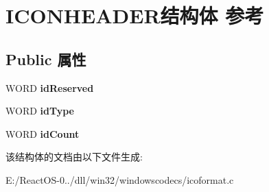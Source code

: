 \hypertarget{struct_i_c_o_n_h_e_a_d_e_r}{}\section{I\+C\+O\+N\+H\+E\+A\+D\+E\+R结构体 参考}
\label{struct_i_c_o_n_h_e_a_d_e_r}
\subsection*{Public 属性}
\begin{DoxyCompactItemize}
\item 
\mbox{\label{struct_i_c_o_n_h_e_a_d_e_r_a3c3c0880fd4a15ee4e060adab2610fee}} 
W\+O\+RD {\bfseries id\+Reserved}
\item 
\mbox{\label{struct_i_c_o_n_h_e_a_d_e_r_a62ffb9f6f6f5122517bf7ffd79318e6e}} 
W\+O\+RD {\bfseries id\+Type}
\item 
\mbox{\label{struct_i_c_o_n_h_e_a_d_e_r_adda212519cf6bd6a83a7f2d43ba0da33}} 
W\+O\+RD {\bfseries id\+Count}
\end{DoxyCompactItemize}


该结构体的文档由以下文件生成\+:\begin{DoxyCompactItemize}
\item 
E\+:/\+React\+O\+S-\/0../dll/win32/windowscodecs/icoformat.\+c\end{DoxyCompactItemize}
